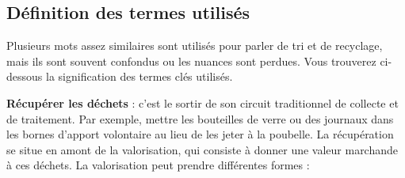 \subsection{Définition des termes utilisés}



Plusieurs mots assez similaires sont utilisés pour parler de tri et de recyclage, mais ils sont souvent confondus ou les nuances sont perdues. Vous trouverez ci-dessous la signification des termes clés utilisés.
\vspace{0.3 cm}

\textbf{Récupérer les déchets} : c’est le sortir de son circuit traditionnel de collecte et de traitement. Par exemple, mettre les bouteilles de verre ou des journaux dans les bornes d’apport volontaire au lieu de les jeter à la poubelle. La récupération se situe en amont de la valorisation, qui consiste à donner une valeur marchande à ces déchets. La valorisation peut prendre différentes formes :

\vspace{0.3cm}


